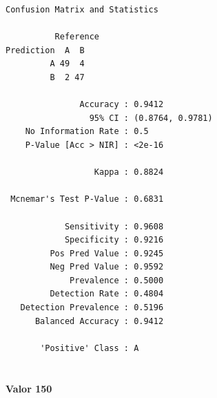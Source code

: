 \documentclass[
  a4paperpaper,
]{article}
\let\oldparagraph\paragraph
\renewcommand{\paragraph}[1]{\oldparagraph{#1}\mbox{}}
\newenvironment{Shaded}{\begin{snugshade}}{\end{snugshade}}
\newcommand{\AttributeTok}[1]{\textcolor[rgb]{0.40,0.45,0.13}{#1}}
\newcommand{\DecValTok}[1]{\textcolor[rgb]{0.68,0.00,0.00}{#1}}
\newcommand{\FunctionTok}[1]{\textcolor[rgb]{0.28,0.35,0.67}{#1}}
\newcommand{\NormalTok}[1]{\textcolor[rgb]{0.00,0.23,0.31}{#1}}
\newcommand{\OtherTok}[1]{\textcolor[rgb]{0.00,0.23,0.31}{#1}}
\newcommand{\SpecialCharTok}[1]{\textcolor[rgb]{0.37,0.37,0.37}{#1}}
\newcommand{\StringTok}[1]{\textcolor[rgb]{0.13,0.47,0.30}{#1}}
\begin{document}
\begin{verbatim}
Confusion Matrix and Statistics

          Reference
Prediction  A  B
         A 49  4
         B  2 47
                                          
               Accuracy : 0.9412          
                 95% CI : (0.8764, 0.9781)
    No Information Rate : 0.5             
    P-Value [Acc > NIR] : <2e-16          
                                          
                  Kappa : 0.8824          
                                          
 Mcnemar's Test P-Value : 0.6831          
                                          
            Sensitivity : 0.9608          
            Specificity : 0.9216          
         Pos Pred Value : 0.9245          
         Neg Pred Value : 0.9592          
             Prevalence : 0.5000          
         Detection Rate : 0.4804          
   Detection Prevalence : 0.5196          
      Balanced Accuracy : 0.9412          
                                          
       'Positive' Class : A               
                                          
\end{verbatim}

\paragraph{Valor 150}\label{valor-150}

\begin{Shaded}
\end{Shaded}
\end{document}
